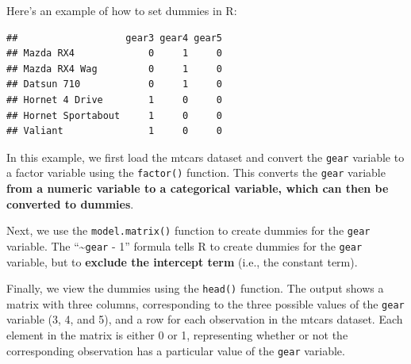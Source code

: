 \documentclass[
]{ctexart}
\newenvironment{Shaded}{\begin{snugshade}}{\end{snugshade}}
\newcommand{\AttributeTok}[1]{\textcolor[rgb]{0.13,0.29,0.53}{#1}}
\newcommand{\CommentTok}[1]{\textcolor[rgb]{0.56,0.35,0.01}{\textit{#1}}}
\newcommand{\DecValTok}[1]{\textcolor[rgb]{0.00,0.00,0.81}{#1}}
\newcommand{\FunctionTok}[1]{\textcolor[rgb]{0.13,0.29,0.53}{\textbf{#1}}}
\newcommand{\NormalTok}[1]{#1}
\newcommand{\OtherTok}[1]{\textcolor[rgb]{0.56,0.35,0.01}{#1}}
\newcommand{\SpecialCharTok}[1]{\textcolor[rgb]{0.81,0.36,0.00}{\textbf{#1}}}
\begin{document}
Here's an example of how to set dummies in R:

\begin{Shaded}
\end{Shaded}

\begin{verbatim}
##                   gear3 gear4 gear5
## Mazda RX4             0     1     0
## Mazda RX4 Wag         0     1     0
## Datsun 710            0     1     0
## Hornet 4 Drive        1     0     0
## Hornet Sportabout     1     0     0
## Valiant               1     0     0
\end{verbatim}

In this example, we first load the mtcars dataset and convert the
\texttt{gear} variable to a factor variable using the \texttt{factor()}
function. This converts the \texttt{gear} variable \textbf{from a
numeric variable to a categorical variable, which can then be converted
to dummies}.

Next, we use the \texttt{model.matrix()} function to create dummies for
the \texttt{gear} variable. The ``\textasciitilde{}\texttt{gear} - 1''
formula tells R to create dummies for the \texttt{gear} variable, but to
\textbf{exclude the intercept term} (i.e., the constant term).

Finally, we view the dummies using the \texttt{head()} function. The
output shows a matrix with three columns, corresponding to the three
possible values of the \texttt{gear} variable (3, 4, and 5), and a row
for each observation in the mtcars dataset. Each element in the matrix
is either 0 or 1, representing whether or not the corresponding
observation has a particular value of the \texttt{gear} variable.
\end{document}
